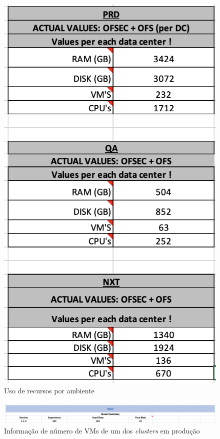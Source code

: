 \begin{figure}[H]
  \centerline{\includegraphics[scale=0.5]{media/content/analise/resources-per-env.png}}
  \caption{Uso de recursos por ambiente}
  \label{resource-usage}
\end{figure}

\begin{figure}[H]
  \centerline{\includegraphics[scale=0.4]{media/content/analise/info-ofsec-prod.png}}
  \caption{Informação de número de VMs de um dos \textit{clusters} em produção}
  \label{vms-info}
\end{figure}

